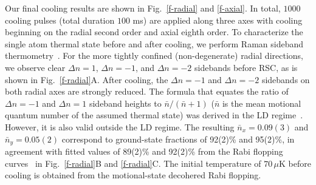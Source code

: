 \documentclass[aps,prl,twocolumn,groupedaddress]{revtex4-1}
\begin{document}
Our final cooling results are shown in Fig.~\ref{f-radial} and \ref{f-axial}.
In total, $1000$ cooling pulses (total duration $100$ ms) are applied
along three axes with cooling beginning on the radial second order and axial eighth order.
To characterize the single atom thermal state before and after cooling,
we perform Raman sideband thermometry~\cite{Monroe1995, Meekhof1996}.
For the more tightly confined (non-degenerate) radial directions,
we observe clear $\Delta n=1$, $\Delta n=-1$, and $\Delta n=-2$ sidebands before RSC, as is shown in Fig.~\ref{f-radial}A.
After cooling, the $\Delta n=-1$ and $\Delta n=-2$ sidebands on both radial axes are strongly reduced.
The formula that equates the ratio of $\Delta n=-1$ and $\Delta n=1$ sideband heights to $\bar{n}/(\bar{n}+1)$ ($\bar{n}$ is the mean motional quantum number of the assumed thermal state) was  derived in the LD regime~\cite{Monroe1995}. However, it is also valid outside the LD regime.  The resulting $\bar{n}_x=0.09(3)$ and $\bar{n}_y=0.05(2)$ correspond to ground-state fractions of 92(2)\% and 95(2)\%,  in agreement with fitted values of 89(2)\% and 92(2)\% from the Rabi flopping curves~ \cite{Meekhof1996} in Fig.~\ref{f-radial}B and \ref{f-radial}C.
The initial temperature of $70\,\mu$K before cooling is obtained
from the motional-state decohered Rabi flopping.
\end{document}
